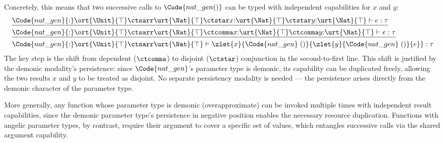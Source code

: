 Concretely, this means that two successive calls to $\Code{nat\_gen()}$
can be typed with independent capabilities for $x$ and $y$:
\begin{align*}
  &\underline{\Code{nat\_gen}{:}\ort{\Unit}{\top} \ctsarr \urt{\Nat}{\top}
    \ctstar x{:}\urt{\Nat}{\top} \ctstar y{:}\urt{\Nat}{\top}
    \vdash e : \tau}
  \\&\underline{\Code{nat\_gen}{:}\ort{\Unit}{\top} \ctsarr \urt{\Nat}{\top}
    \ctcomma x{:}\urt{\Nat}{\top} \ctcomma y{:}\urt{\Nat}{\top}
    \vdash e : \tau}
  \\&\Code{nat\_gen}{:}\ort{\Unit}{\top} \ctsarr \urt{\Nat}{\top}
    \vdash \zlet{x}{\Code{nat\_gen}\;()}{\zlet{y}{\Code{nat\_gen}\;()}{e}} : \tau
\end{align*}
The key step is the shift from dependent ($\ctcomma$) to disjoint
($\ctstar$) conjunction in the second-to-first line.  This shift is
justified by the demonic modality's persistence: since
$\Code{nat\_gen}$'s parameter type is demonic, its capability can be
duplicated freely, allowing the two results $x$ and $y$ to be treated
as disjoint.  No separate persistency modality is needed — the
persistence arises directly from the demonic character of the parameter
type.

More generally, any function whose parameter type is demonic
(overapproximate) can be invoked multiple times with independent result
capabilities, since the demonic parameter type's persistence in negative
position enables the necessary resource duplication.  Functions with
angelic parameter types, by contrast, require their argument to cover
a specific set of values, which entangles successive calls via the
shared argument capability.

